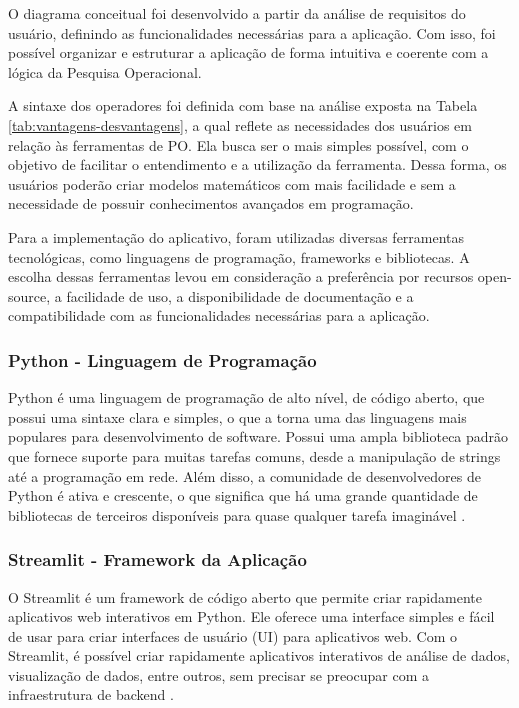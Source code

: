 \documentclass{article}
\begin{document}
O diagrama conceitual foi desenvolvido a partir da análise de requisitos do usuário, definindo as funcionalidades necessárias para a aplicação. Com isso, foi possível organizar e estruturar a aplicação de forma intuitiva e coerente com a lógica da Pesquisa Operacional.

A sintaxe dos operadores foi definida com base na análise exposta na Tabela \ref{tab:vantagens-desvantagens}, a qual reflete as necessidades dos usuários em relação às ferramentas de PO. Ela busca ser o mais simples possível, com o objetivo de facilitar o entendimento e a utilização da ferramenta. Dessa forma, os usuários poderão criar modelos matemáticos com mais facilidade e sem a necessidade de possuir conhecimentos avançados em programação.

Para a implementação do aplicativo, foram utilizadas diversas ferramentas tecnológicas, como linguagens de programação, frameworks e bibliotecas. A escolha dessas ferramentas levou em consideração a preferência por recursos open-source, a facilidade de uso, a disponibilidade de documentação e a compatibilidade com as funcionalidades necessárias para a aplicação.

\subsubsection{Python - Linguagem de Programação}

Python é uma linguagem de programação de alto nível, de código aberto, que possui uma sintaxe clara e simples, o que a torna uma das linguagens mais populares para desenvolvimento de software. Possui uma ampla biblioteca padrão que fornece suporte para muitas tarefas comuns, desde a manipulação de strings até a programação em rede. Além disso, a comunidade de desenvolvedores de Python é ativa e crescente, o que significa que há uma grande quantidade de bibliotecas de terceiros disponíveis para quase qualquer tarefa imaginável \cite{python}.

\subsubsection{Streamlit - Framework da Aplicação}

O Streamlit é um framework de código aberto que permite criar rapidamente aplicativos web interativos em Python. Ele oferece uma interface simples e fácil de usar para criar interfaces de usuário (UI) para aplicativos web. Com o Streamlit, é possível criar rapidamente aplicativos interativos de análise de dados, visualização de dados, entre outros, sem precisar se preocupar com a infraestrutura de backend \cite{streamlit}.
\end{document}

